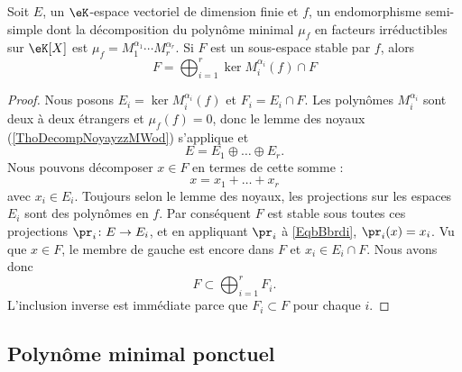 \begin{corollary}   \label{CorKiSCkC}
    Soit \( E\), un \( \eK\)-espace vectoriel de dimension finie et \( f\), un endomorphisme semi-simple dont la décomposition du polynôme minimal \( \mu_f\) en facteurs irréductibles sur \( \eK[X]\) est \( \mu_f=M_1^{\alpha_1}\cdots M_r^{\alpha_r}\). Si \( F\) est un sous-espace stable par \( f\), alors
    \begin{equation}
        F=\bigoplus_{i=1}^r\ker M_i^{\alpha_i}(f)\cap F
    \end{equation}
\end{corollary}

\begin{proof}
    Nous posons \( E_i=\ker M_i^{\alpha_i}(f)\) et \( F_i=E_i\cap F\). Les polynômes \( M_i^{\alpha_i}\) sont deux à deux étrangers et \( \mu_f(f)=0\), donc le lemme des noyaux (\ref{ThoDecompNoyayzzMWod}) s'applique et
    \begin{equation}
        E=E_1\oplus\ldots\oplus E_r.
    \end{equation}
    Nous pouvons décomposer \( x\in F\) en termes de cette somme :
    \begin{equation}     \label{EqbBbrdi}
        x=x_1+\ldots +x_r
    \end{equation}
    avec \( x_i\in E_i\). Toujours selon le lemme des noyaux, les projections sur les espaces \( E_i\) sont des polynômes en \( f\). Par conséquent \( F\) est stable sous toutes ces projections \( \pr_i\colon E\to E_i\), et en appliquant \( \pr_i\) à \eqref{EqbBbrdi}, \( \pr_i(x)=x_i\). Vu que \( x\in F\), le membre de gauche est encore dans \( F\) et \( x_i\in E_i\cap F\). Nous avons donc
    \begin{equation}
        F\subset\bigoplus_{i=1}^rF_i.
    \end{equation}
    L'inclusion inverse est immédiate parce que \( F_i\subset F\) pour chaque \( i\).
\end{proof}

\subsection{Polynôme minimal ponctuel}

